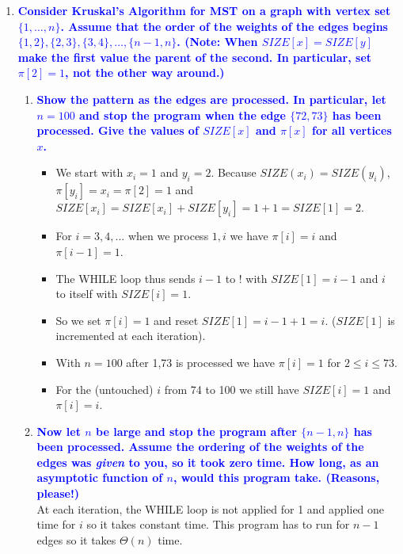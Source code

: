 \documentclass[11pt]{article}
\begin{document}
\begin{enumerate}
\item \textbf{\textcolor{blue}{Consider Kruskal's Algorithm for MST on a graph with vertex set
$\{1,\ldots,n\}$.  Assume that the order of the weights of the edges
begins $\{1,2\}, \{2,3\}, \{3,4\},\ldots, \{n-1,n\}$.  (Note: When 
$SIZE[x]=SIZE[y]$ make the first value the parent of the second.
In particular, set $\pi[2]=1$, not the other way around.)}}
    \begin{enumerate}
    \item \textbf{\textcolor{blue}{Show the pattern as the edges are processed.  In particular,
    let $n=100$ and stop the program when the edge $\{72,73\}$ has
    been processed.  Give the values of $SIZE[x]$ and $\pi[x]$ for all
    vertices $x$.}}
        \begin{itemize}
            \item We start with $x_i = 1$ and $y_i = 2$. Because $SIZE(x_i) = SIZE(y_i)$, $\pi[y_i] = x_i= \pi[2] = 1$ and $SIZE[x_i] = SIZE[x_i] + SIZE[y_i] = 1 + 1 = SIZE[1] = 2$. 
            \item For $i = 3,4,...$ when we process $1,i$ we have $\pi[i] = i$ and $\pi[i - 1] = 1$.
            \item The WHILE loop thus sends $i-1$ to ! with $SIZE[1] = i-1$ and $i$ to itself with $SIZE[i] = 1$.
            \item So we set $\pi[i] = 1$ and reset $SIZE[1] = i-1+1 = i$.
            ($SIZE[1]$ is incremented at each iteration).
            \item With $n=100$ after {1,73} is processed we have $\pi[i] = 1$ for $2 \leq i \leq 73$.
            \item For the (untouched) $i$ from 74 to 100 we still have $SIZE[i] = 1$ and $\pi[i] = i$.
        \end{itemize}
    \item \textbf{\textcolor{blue}{Now let $n$ be large and stop the program after $\{n-1,n\}$ has
    been processed.  Assume the ordering of the weights of the edges
    was {\em given} to you, so it took zero time.  How long, as an
    asymptotic function of $n$, would this program take.  (Reasons, please!)}}
        \\ At each iteration, the WHILE loop is not applied for 1 and applied one time for $i$ so it takes constant time. This program has to run for $n - 1$ edges so it takes $\Theta(n)$ time.
    \end{enumerate}



\end{enumerate}
\end{document}
